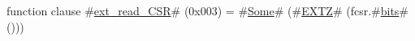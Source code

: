 function clause #\hyperref[sailRISCVzextzyreadzyCSR]{ext\_read\_CSR}# (0x003) = #\hyperref[sailRISCVzSome]{Some}# (#\hyperref[sailRISCVzEXTZ]{EXTZ}# (fcsr.#\hyperref[sailRISCVzbits]{bits}#()))
